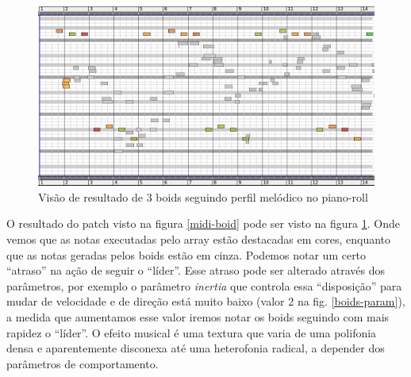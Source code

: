 \documentclass{ppgmus}
\begin{document}
\begin{figure}
\includegraphics[scale=.5]{boids-pianoroll}
\caption{Visão de resultado de 3 boids seguindo perfil melódico no piano-roll}
\label{boids-pianoroll}
\end{figure} 

O resultado do patch visto na figura \ref{midi-boid} pode ser visto
na figura \ref{boids-pianoroll}. Onde vemos que as notas executadas pelo array estão destacadas
em cores, enquanto que as notas geradas pelos boids estão em cinza. Podemos notar um certo ``atraso''
 na ação de seguir o ``líder''. Esse atraso pode ser alterado através dos parâmetros, por exemplo
o parâmetro \textit{inertia} que controla essa ``disposição'' para mudar de velocidade e de direção
está muito baixo (valor 2 na fig. \ref{boids-param}), a medida que aumentamos esse valor iremos notar
os boids seguindo com mais rapidez o ``líder''.
O efeito musical é uma textura que varia de uma polifonia densa e aparentemente disconexa até uma 
heterofonia radical, a depender dos parâmetros de comportamento.


\end{document}
